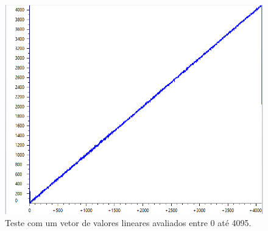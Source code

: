 			 	\begin{figure}[!ht]
			 		\centering
			 		\includegraphics[scale=0.5]{./figuras/simulacoes/mcp4725.PNG}
			 		\caption{Teste com um vetor de valores lineares avaliados entre 0 até 4095.}
			 		\label{fig-mcp4725}
			 	\end{figure}
				 
				 
				 
				
				
			
